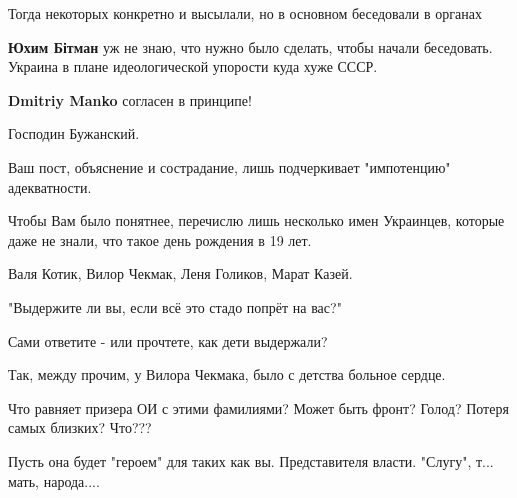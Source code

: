 \begin{itemize}
\begin{itemize}
 
Тогда некоторых конкретно и высылали, но в основном беседовали в органах

 
\textbf{Юхим Бітман} уж не знаю, что нужно было сделать, чтобы начали беседовать. Украина в плане идеологической упорости куда хуже СССР.

 
\textbf{Dmitriy Manko} согласен в принципе!
\end{itemize}

 

Господин Бужанский.

Ваш пост, объяснение и сострадание, лишь подчеркивает "импотенцию"
адекватности.

Чтобы Вам было понятнее, перечислю лишь несколько имен Украинцев, которые даже
не знали, что такое день рождения в 19 лет.

Валя Котик, Вилор Чекмак, Леня Голиков, Марат Казей.

"Выдержите ли вы, если всё это стадо попрёт на вас?"

Сами ответите - или прочтете, как дети выдержали?

Так, между прочим, у Вилора Чекмака, было с детства больное сердце.

Что равняет призера ОИ с этими фамилиями? Может быть фронт? Голод? Потеря самых
близких? Что???

Пусть она будет "героем" для таких как вы. Представителя власти. "Слугу", т...
мать, народа....


\end{itemize}
